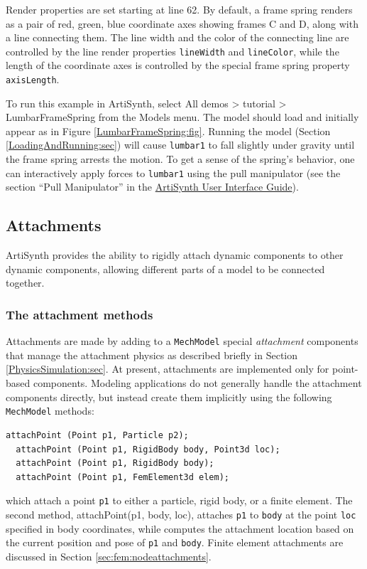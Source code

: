 Render properties are set starting at line 62. By default, a frame
spring renders as a pair of red, green, blue coordinate axes showing
frames C and D, along with a line connecting them. The line width and
the color of the connecting line are controlled by the line render
properties {\tt lineWidth} and {\tt lineColor}, while the length of
the coordinate axes is controlled by the special frame spring property
{\tt axisLength}.

To run this example in ArtiSynth, select {\sf All demos > tutorial >
LumbarFrameSpring} from the {\sf Models} menu. The model should load
and initially appear as in Figure \ref{LumbarFrameSpring:fig}.
Running the model (Section \ref{LoadingAndRunning:sec}) will cause
{\tt lumbar1} to fall slightly under gravity until the frame spring
arrests the motion. To get a sense of the spring's behavior, one can
interactively apply forces to {\tt lumbar1} using the pull manipulator
(see the section ``Pull Manipulator'' in the
\href{../uiguide/uiguide.html}{
ArtiSynth User Interface Guide}).

\subsection{Attachments}
\label{Attachments:sec}

ArtiSynth provides the ability to rigidly attach dynamic components to
other dynamic components, allowing different parts of a model to be
connected together.

\subsubsection{The attachment methods}

Attachments are made by adding to a {\tt MechModel} special {\it
attachment} components that manage the attachment physics as described
briefly in Section \ref{PhysicsSimulation:sec}. At present,
attachments are implemented only for point-based components.  Modeling
applications do not generally handle the attachment components
directly, but instead create them implicitly using the following {\tt
MechModel} methods:
%
\begin{lstlisting}[]
  attachPoint (Point p1, Particle p2);
  attachPoint (Point p1, RigidBody body, Point3d loc);
  attachPoint (Point p1, RigidBody body);
  attachPoint (Point p1, FemElement3d elem);
\end{lstlisting}
%
which attach a point {\tt p1} to either a particle, rigid body, or a
finite element.  The second method,
{attachPoint(p1, body, loc)}, attaches {\tt p1} to {\tt body} at the
point {\tt loc} specified in body coordinates, while
 computes the attachment location based on the current position
and pose of {\tt p1} and {\tt body}.  
Finite element attachments are discussed in Section
\ref{sec:fem:nodeattachments}.

